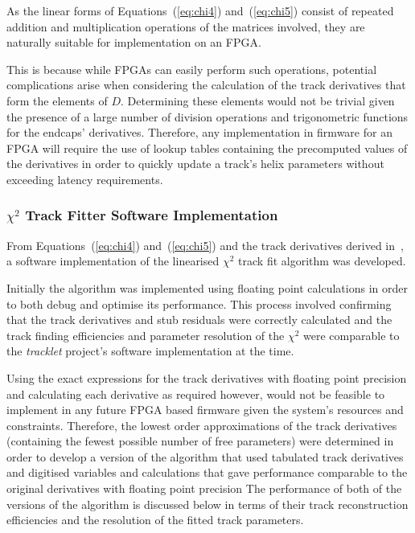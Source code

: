 As the linear forms of Equations~(\ref{eq:chi4}) and~(\ref{eq:chi5}) consist of repeated addition and multiplication operations of the matrices involved, they are naturally suitable for implementation on an FPGA.

This is because while FPGAs can easily perform such operations, potential complications arise when considering the calculation of the track derivatives that form the elements of $D$.
Determining these elements would not be trivial given the presence of a large number of division operations and trigonometric functions for the endcaps' derivatives.
Therefore, any implementation in firmware for an FPGA will require the use of lookup tables containing the precomputed values of the derivatives in order to quickly update a track's helix parameters without exceeding latency requirements.

\subsubsection{$\chi^{2}$ Track Fitter Software Implementation}\label{subsubsec:chi2software}
From Equations~(\ref{eq:chi4}) and~(\ref{eq:chi5}) and the track derivatives derived in~\cite{CMS_DN-14-043}, a software implementation of the linearised $\chi^{2}$ track fit algorithm was developed.

Initially the algorithm was implemented using floating point calculations in order to both debug and optimise its performance.
This process involved confirming that the track derivatives and stub residuals were correctly calculated and the track finding efficiencies and parameter resolution of the $\chi^{2}$ were comparable to the \emph{tracklet} project's software implementation at the time.

Using the exact expressions for the track derivatives with floating point precision and calculating each derivative as required however, would not be feasible to implement in any future FPGA based firmware given the system's resources and constraints.
Therefore, the lowest order approximations of the track derivatives (containing the fewest possible number of free parameters) were determined in order to develop a version of the algorithm that used tabulated track derivatives and digitised variables and calculations that gave performance comparable to the original derivatives with floating point precision
The performance of both of the versions of the algorithm is discussed below in terms of their track reconstruction efficiencies and the resolution of the fitted track parameters.

